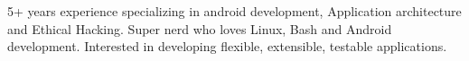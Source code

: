 

\begin{cvparagraph}

5+ years experience specializing in android development, Application architecture and Ethical Hacking. Super nerd who loves Linux, Bash and Android development. Interested in developing flexible, extensible, testable applications.
\end{cvparagraph}
